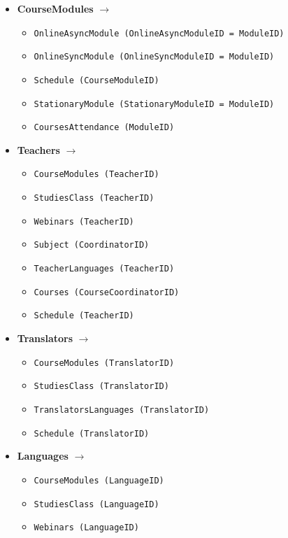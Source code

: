 \documentclass[12pt]{article}
\begin{document}
\begin{itemize}
    \item \textbf{CourseModules} \(\rightarrow\)
        \begin{itemize}
            \item \texttt{OnlineAsyncModule (OnlineAsyncModuleID = ModuleID)}
            \item \texttt{OnlineSyncModule (OnlineSyncModuleID = ModuleID)}
            \item \texttt{Schedule (CourseModuleID)}
            \item \texttt{StationaryModule (StationaryModuleID = ModuleID)}
            \item \texttt{CoursesAttendance (ModuleID)}
        \end{itemize}
    \item \textbf{Teachers} \(\rightarrow\)
        \begin{itemize}
            \item \texttt{CourseModules (TeacherID)}
            \item \texttt{StudiesClass (TeacherID)}
            \item \texttt{Webinars (TeacherID)}
            \item \texttt{Subject (CoordinatorID)}
            \item \texttt{TeacherLanguages (TeacherID)}
            \item \texttt{Courses (CourseCoordinatorID)}
            \item \texttt{Schedule (TeacherID)}
        \end{itemize}
    \item \textbf{Translators} \(\rightarrow\)
        \begin{itemize}
            \item \texttt{CourseModules (TranslatorID)}
            \item \texttt{StudiesClass (TranslatorID)}
            \item \texttt{TranslatorsLanguages (TranslatorID)}
            \item \texttt{Schedule (TranslatorID)}
        \end{itemize}
    \item \textbf{Languages} \(\rightarrow\)
        \begin{itemize}
            \item \texttt{CourseModules (LanguageID)}
            \item \texttt{StudiesClass (LanguageID)}
            \item \texttt{Webinars (LanguageID)}

\end{itemize}
\end{itemize}
\end{document}

